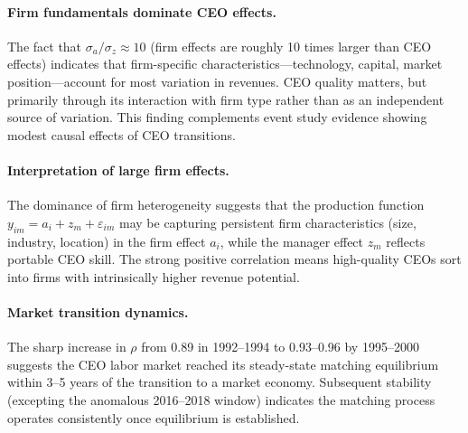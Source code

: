 \documentclass[11pt]{article}
\begin{document}
\paragraph{Firm fundamentals dominate CEO effects.} The fact that $\sigma_a/\sigma_z \approx 10$ (firm effects are roughly 10 times larger than CEO effects) indicates that firm-specific characteristics---technology, capital, market position---account for most variation in revenues. CEO quality matters, but primarily through its interaction with firm type rather than as an independent source of variation. This finding complements event study evidence showing modest causal effects of CEO transitions.

\paragraph{Interpretation of large firm effects.} The dominance of firm heterogeneity suggests that the production function $y_{im} = a_i + z_m + \varepsilon_{im}$ may be capturing persistent firm characteristics (size, industry, location) in the firm effect $a_i$, while the manager effect $z_m$ reflects portable CEO skill. The strong positive correlation means high-quality CEOs sort into firms with intrinsically higher revenue potential.

\paragraph{Market transition dynamics.} The sharp increase in $\rho$ from 0.89 in 1992--1994 to 0.93--0.96 by 1995--2000 suggests the CEO labor market reached its steady-state matching equilibrium within 3--5 years of the transition to a market economy. Subsequent stability (excepting the anomalous 2016--2018 window) indicates the matching process operates consistently once equilibrium is established.
\end{document}
